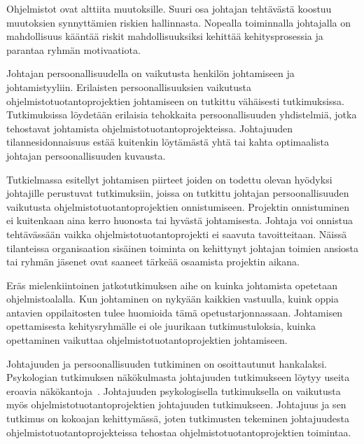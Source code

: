 \documentclass[finnish]{tktltiki2}
\theoremstyle{definition}
\theoremstyle{remark}
\begin{document}
Ohjelmistot ovat alttiita muutoksille. Suuri osa johtajan tehtävästä koostuu muutoksien synnyttämien riskien hallinnasta. Nopealla toiminnalla johtajalla on mahdollisuus kääntää riskit mahdollisuuksiksi kehittää kehitysprosessia ja parantaa ryhmän motivaatiota.

Johtajan persoonallisuudella on vaikutusta henkilön johtamiseen ja johtamistyyliin. Erilaisten persoonallisuuksien vaikutusta ohjelmistotuotantoprojektien johtamiseen on tutkittu vähäisesti tutkimuksissa. Tutkimuksissa löydetään erilaisia tehokkaita persoonallisuuden yhdistelmiä, jotka tehostavat johtamista ohjelmistotuotantoprojekteissa. Johtajuuden tilannesidonnaisuus estää kuitenkin löytämästä yhtä tai kahta optimaalista johtajan persoonallisuuden kuvausta.

Tutkielmassa esitellyt johtamisen piirteet joiden on todettu olevan hyödyksi johtajille perustuvat tutkimuksiin, joissa on tutkittu johtajan persoonallisuuden vaikutusta ohjelmistotuotantoprojektien onnistumiseen. Projektin onnistuminen ei kuitenkaan aina kerro huonosta tai hyvästä johtamisesta. Johtaja voi onnistua tehtävässään vaikka ohjelmistotuotantoprojekti ei saavuta tavoitteitaan. Näissä tilanteissa organisaation sisäinen toiminta on kehittynyt johtajan toimien ansiosta tai ryhmän jäsenet ovat saaneet tärkeää osaamista projektin aikana.

Eräs mielenkiintoinen jatkotutkimuksen aihe on kuinka johtamista opetetaan ohjelmistoalalla. Kun johtaminen on nykyään kaikkien vastuulla, kuink oppia antavien oppilaitosten tulee huomioida tämä opetustarjonnassaan. Johtamisen opettamisesta kehitysryhmälle ei ole juurikaan tutkimustuloksia, kuinka opettaminen vaikuttaa ohjelmistotuotantoprojektien johtamiseen.

Johtajuuden ja persoonallisuuden tutkiminen on osoittautunut hankalaksi. Psykologian tutkimuksen näkökulmasta johtajuuden tutkimukseen löytyy useita eroavia näkökantoja~\cite{haslam2011}. Johtajuuden psykologisella tutkimuksella on vaikutusta myös ohjelmistotuotantoprojektien johtajuuden tutkimukseen. Johtajuus ja sen tutkimus on kokoajan kehittymässä, joten tutkimusten tekeminen johtajuudesta ohjelmistotuotantoprojekteissa tehostaa ohjelmistotuotantoprojektien toimintaa.   

   

\newpage 



 











%

%
% 
%



\end{document}
